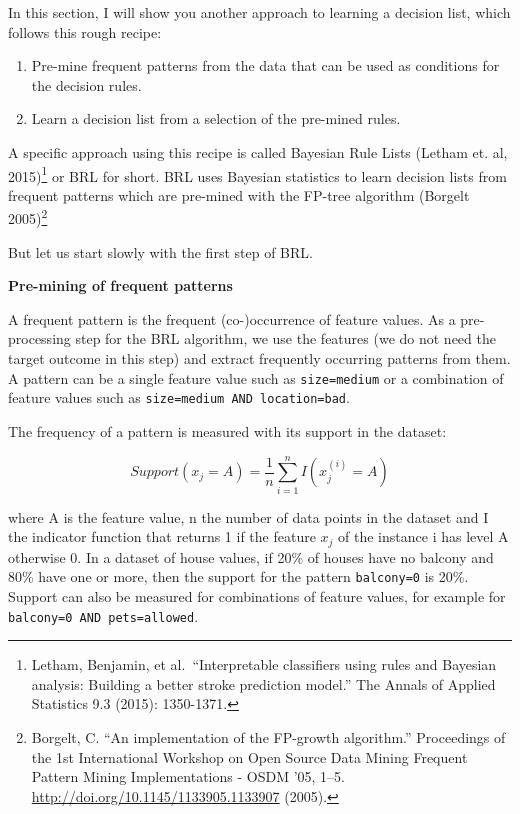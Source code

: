 \documentclass[
  12pt,
]{krantz}
\providecommand{\tightlist}{%
  \setlength{\itemsep}{0pt}\setlength{\parskip}{0pt}}
\begin{document}
In this section, I will show you another approach to learning a decision list, which follows this rough recipe:

\begin{enumerate}
\def\labelenumi{\arabic{enumi}.}
\tightlist
\item
  Pre-mine frequent patterns from the data that can be used as conditions for the decision rules.
\item
  Learn a decision list from a selection of the pre-mined rules.
\end{enumerate}

A specific approach using this recipe is called Bayesian Rule Lists (Letham et. al, 2015)\footnote{Letham, Benjamin, et al.~``Interpretable classifiers using rules and Bayesian analysis: Building a better stroke prediction model.'' The Annals of Applied Statistics 9.3 (2015): 1350-1371.} or BRL for short.
BRL uses Bayesian statistics to learn decision lists from frequent patterns which are pre-mined with the FP-tree algorithm (Borgelt 2005)\footnote{Borgelt, C. ``An implementation of the FP-growth algorithm.'' Proceedings of the 1st International Workshop on Open Source Data Mining Frequent Pattern Mining Implementations - OSDM '05, 1--5. \url{http://doi.org/10.1145/1133905.1133907} (2005).}

But let us start slowly with the first step of BRL.

\textbf{Pre-mining of frequent patterns}

A frequent pattern is the frequent (co-)occurrence of feature values.
As a pre-processing step for the BRL algorithm, we use the features (we do not need the target outcome in this step) and extract frequently occurring patterns from them.
A pattern can be a single feature value such as \texttt{size=medium} or a combination of feature values such as \texttt{size=medium\ AND\ location=bad}.

The frequency of a pattern is measured with its support in the dataset:

\[Support(x_j=A)=\frac{1}n{}\sum_{i=1}^nI(x^{(i)}_{j}=A)\]

where A is the feature value, n the number of data points in the dataset and I the indicator function that returns 1 if the feature \(x_j\) of the instance i has level A otherwise 0.
In a dataset of house values, if 20\% of houses have no balcony and 80\% have one or more, then the support for the pattern \texttt{balcony=0} is 20\%.
Support can also be measured for combinations of feature values, for example for \texttt{balcony=0\ AND\ pets=allowed}.
\end{document}
